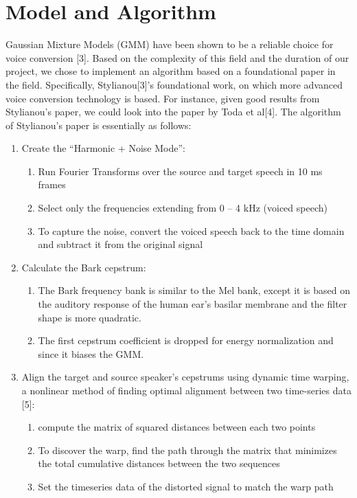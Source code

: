 \documentclass{article}
\begin{document}
\section{Model and Algorithm}
Gaussian Mixture Models (GMM) have been shown to be a reliable choice for voice conversion [3]. Based on the complexity of this field and the duration of our project, we chose to implement an algorithm based on a foundational paper in the field. Specifically, Stylianou[3]'s foundational work, on which more advanced voice conversion technology is based. For instance, given good results from Stylianou's paper, we could look into the paper by Toda et al[4].  The algorithm of Stylianou's paper is essentially as follows:
\begin{enumerate}
\item Create the ``Harmonic + Noise Mode'':
\begin{enumerate}
\item Run Fourier Transforms over the source and target speech in 10 ms frames
\item Select only the frequencies extending from 0 -- 4 kHz (voiced speech)
\item To capture the noise, convert the voiced speech back to the time domain and subtract it from the original signal
\end{enumerate}

\item Calculate the Bark cepstrum:
\begin{enumerate}
\item The Bark frequency bank is similar to the Mel bank, except it is based on the auditory response of the human ear's basilar membrane and the filter shape is more quadratic.
\item The first cepstrum coefficient is dropped for energy normalization and since it biases the GMM.
\end{enumerate}

\item Align the target and source speaker's cepstrums using dynamic time warping, a nonlinear method of finding optimal alignment between two time-series data [5]:
\begin{enumerate}
\item compute the matrix of squared distances between each two points
\item To discover the warp, find the path through the matrix that minimizes the total cumulative distances between the two sequences
\item Set the timeseries data of the distorted signal to match the warp path
\end{enumerate}


\end{enumerate}
\end{document}
